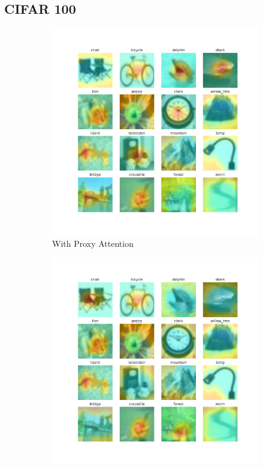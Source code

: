 \subsection{CIFAR 100}
\begin{figure}[H]
    \centering
    \begin{subfigure}[b]{0.7\textwidth}
        \includegraphics[width=\textwidth]{images/proxy.pdf}
        \caption{With Proxy Attention}
        \label{fig:proxy}
    \end{subfigure}
    \hfill
    \begin{subfigure}[b]{.7\textwidth}
        \includegraphics[width=\textwidth]{images/noproxy.pdf}

\end{subfigure}
\end{figure}
